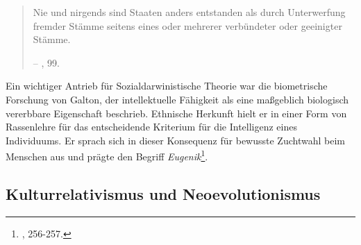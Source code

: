 \documentclass[openany,twoside,twocolumn]{book}
\let\rmarkdownfootnote\footnote%
\def\footnote{\protect\rmarkdownfootnote}
\begin{document}
\begin{quote}
Nie und nirgends sind Staaten anders entstanden als durch Unterwerfung fremder Stämme seitens eines oder mehrerer verbündeter oder geeinigter Stämme.

-- \textcite{GumplowiczGrundrissSoziologie1885}, 99.
\end{quote}

Ein wichtiger Antrieb für Sozialdarwinistische Theorie war die biometrische Forschung von Galton, der intellektuelle Fähigkeit als eine maßgeblich biologisch vererbbare Eigenschaft beschrieb. Ethnische Herkunft hielt er in einer Form von Rassenlehre für das entscheidende Kriterium für die Intelligenz eines Individuums. Er sprach sich in dieser Konsequenz für bewusste Zuchtwahl beim Menschen aus und prägte den Begriff \emph{Eugenik}\footnote{\textcite{bowler_evolution_1989}, 256-257.}.

\hypertarget{cultural-relativism-neoevolutionism}{%
\subsection{Kulturrelativismus und Neoevolutionismus}\label{cultural-relativism-neoevolutionism}}
\end{document}
